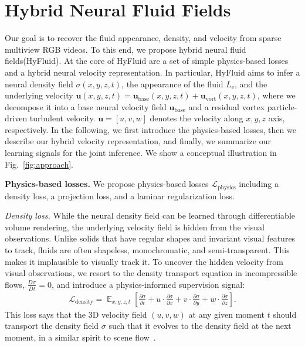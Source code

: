 \documentclass{article}
\newcommand{\fig}[1]{Fig.~\ref{#1}}
\newcommand{\modelfull}{hybrid neural fluid fields\xspace}
\newcommand{\model}{HyFluid\xspace}
\newcommand{\myparagraph}[1]{\vspace{0.1cm}\noindent\textbf{#1}}
\begin{document}
\section{Hybrid Neural Fluid Fields}

Our goal is to recover the fluid appearance, density, and velocity from sparse multiview RGB videos. To this end, we propose \modelfull (\model). At the core of \model are a set of simple physics-based losses and a hybrid neural velocity representation. In particular, \model aims to infer a neural density field $\sigma(x, y, z, t)$, the appearance of the fluid $L_\text{e}$, and the underlying velocity $\mathbf{u}(x, y, z, t) = \mathbf{u}_\text{base}(x, y, z, t) + \mathbf{u}_\text{vort}(x, y, z, t)$, where we decompose it into a base neural velocity field $\mathbf{u}_\text{base}$ and a residual vortex particle-driven turbulent velocity. $\mathbf{u} = [u, v, w]$ denotes the velocity along $x, y, z$ axis, respectively. In the following, we first introduce the physics-based losses, then we describe our hybrid velocity representation, and finally, we summarize our learning signals for the joint inference. We show a conceptual illustration in \fig{fig:approach}.

\myparagraph{Physics-based losses.} We propose physics-based losses $\mathcal{L}_\text{physics}$ including a density loss, a projection loss, and a laminar regularization loss.

\emph{Density loss.} While the neural density field can be learned through differentiable volume rendering, the underlying velocity field is hidden from the visual observations. Unlike solids that have regular shapes and invariant visual features to track, fluids are often shapeless, monochromatic, and semi-transparent. This makes it implausible to visually track it. To uncover the hidden velocity from visual observations, we resort to the density transport equation in incompressible flows, $\frac{D\sigma}{Dt} = 0$, and introduce a physics-informed supervision signal:
\begin{align}\label{eqn:density_transport}
    \mathcal{L}_\text{density} = \mathop{\mathbb{E}}_{x, y, z, t}\left[\frac{\partial\sigma}{\partial t} + u\cdot\frac{\partial\sigma}{\partial x} + v\cdot\frac{\partial\sigma}{\partial y} + w\cdot\frac{\partial\sigma}{\partial z}\right].
\end{align}
This loss says that the 3D velocity field $(u, v, w)$ at any given moment $t$ should transport the density field $\sigma$ such that it evolves to the density field at the next moment, in a similar spirit to scene flow~\citep{vedula1999three}.
\end{document}
